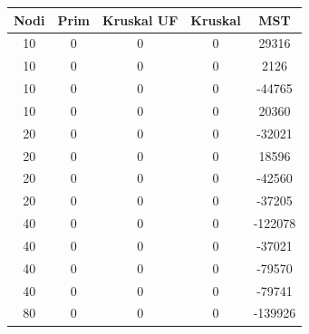 \documentclass[a4paper]{article}
\begin{document}
\begin{table}[]
  \begin{minipage}[b]{10cm}
    \begin{tabular}{|c|c|c|c|c|}
      \rowcolor{gray!50}
      \hline
      \textbf{Nodi} & \textbf{Prim} & \textbf{Kruskal UF} & \textbf{Kruskal} & \textbf{MST} \\ \hline
      10            & 0             & 0                   & 0                & 29316        \\ \hline
      10            & 0             & 0                   & 0                & 2126         \\ \hline
      10            & 0             & 0                   & 0                & -44765       \\ \hline
      10            & 0             & 0                   & 0                & 20360        \\ \hline
      20            & 0             & 0                   & 0                & -32021       \\ \hline
      20            & 0             & 0                   & 0                & 18596        \\ \hline
      20            & 0             & 0                   & 0                & -42560       \\ \hline
      20            & 0             & 0                   & 0                & -37205       \\ \hline
      40            & 0             & 0                   & 0                & -122078      \\ \hline
      40            & 0             & 0                   & 0                & -37021       \\ \hline
      40            & 0             & 0                   & 0                & -79570       \\ \hline
      40            & 0             & 0                   & 0                & -79741       \\ \hline
      80            & 0             & 0                   & 0                & -139926      \\ \hline

\end{tabular}
\end{minipage}
\end{table}
\end{document}
